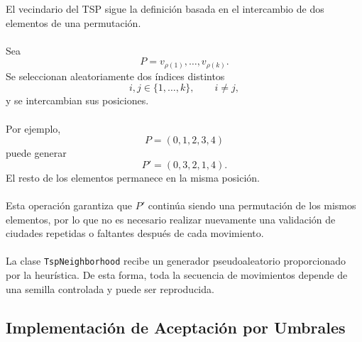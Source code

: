 \documentclass[12pt]{article}
\begin{document}
El vecindario del TSP sigue la definición basada en el intercambio de dos
elementos de una permutación.
\\\\
Sea
\[
    P=
    v_{\rho(1)},\ldots,v_{\rho(k)}.
\]
Se seleccionan aleatoriamente dos índices distintos
\[
    i,j\in\{1,\ldots,k\},
    \qquad
    i\neq j,
\]
y se intercambian sus posiciones.
\\\\
Por ejemplo,
\[
    P=
    (0,1,2,3,4)
\]
puede generar
\[
    P'=
    (0,3,2,1,4).
\]
El resto de los elementos permanece en la misma posición.
\\\\
Esta operación garantiza que \(P'\) continúa siendo una permutación de los
mismos elementos, por lo que no es necesario realizar nuevamente una
validación de ciudades repetidas o faltantes después de cada movimiento.
\\\\
La clase \texttt{TspNeighborhood} recibe un generador pseudoaleatorio
proporcionado por la heurística. De esta forma, toda la secuencia de
movimientos depende de una semilla controlada y puede ser reproducida.

\subsection{Implementación de Aceptación por Umbrales}
\end{document}
